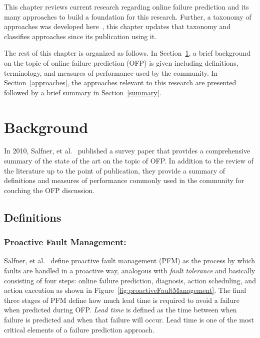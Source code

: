 This chapter reviews current research regarding online failure prediction and
its many approaches to build a foundation for this research.  Further, a
taxonomy of approaches was developed here~\cite{salfnerSurvey}, this chapter
updates that taxonomy and classifies approaches since its publication using it.

The rest of this chapter is organized as follows.  In Section~\ref{background},
a brief background on the topic of online failure prediction (OFP) is given
including definitions, terminology, and measures of performance used by the
community.  In Section~\ref{approaches}, the approaches relevant to this
research are presented followed by a brief summary in Section~\ref{summary}.

\section{Background} \label{background}
In 2010, Salfner, et al.~\cite{salfnerSurvey} published a survey paper that
provides a comprehensive summary of the state of the art on the topic of OFP.
In addition to the review of the literature up to the point of publication,
they provide a summary of definitions and measures of performance commonly used
in the community for couching the OFP discussion.

\subsection{Definitions} \label{definitions}
\subsubsection{Proactive Fault Management:} \label{pfm}
Salfner, et al.~\cite{salfnerSurvey} define proactive fault management (PFM) as
the process by which faults are handled in a proactive way, analogous with
\emph{fault tolerance} and basically consisting of four steps: online failure
prediction, diagnosis, action scheduling, and action execution as shown in
Figure~\ref{fig:proactiveFaultManagement}.
The final three stages of PFM define how much lead time is required to avoid a
failure when predicted during OFP.  \emph{Lead time} is defined as the time
between when failure is predicted and when that failure will occur.  Lead time
is one of the most critical elements of a failure prediction approach.

\figproactiveFaultManagement

